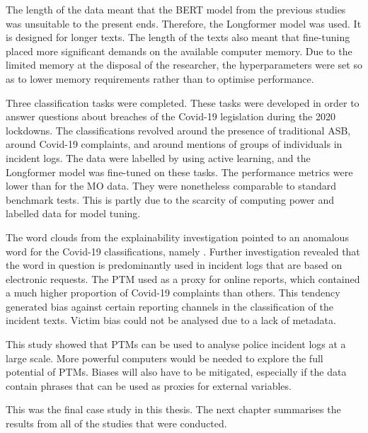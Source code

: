 The length of the data meant that the BERT model from the previous studies was unsuitable to the present ends. Therefore, the Longformer model was used. It is designed for longer texts. The length of the texts also meant that fine-tuning placed more significant demands on the available computer memory. Due to the limited memory at the disposal of the researcher, the hyperparameters were set so as to lower memory requirements rather than to optimise performance.

Three classification tasks were completed. These tasks were developed in order to answer questions about breaches of the Covid-19 legislation during the 2020 lockdowns. The classifications revolved around the presence of traditional ASB, around Covid-19 complaints, and around mentions of groups of individuals in incident logs. The data were labelled by using active learning, and the Longformer model was fine-tuned on these tasks. The performance metrics were lower than for the MO data. They were nonetheless comparable to standard benchmark tests. This is partly due to the scarcity of computing power and labelled data for model tuning.

The word clouds from the explainability investigation pointed to an anomalous word for the Covid-19 classifications, namely . Further investigation revealed that the word in question is predominantly used in incident logs that are based on electronic requests. The PTM used  as a proxy for online reports, which contained a much higher proportion of Covid-19 complaints than others. This tendency generated bias against certain reporting channels in the classification of the incident texts. Victim bias could not be analysed due to a lack of metadata.

This study showed that PTMs can be used to analyse police incident logs at a large scale. More powerful computers would be needed to explore the full potential of PTMs. Biases will also have to be mitigated, especially if the data contain phrases that can be used as proxies for external variables.

This was the final case study in this thesis. The next chapter summarises the results from all of the studies that were conducted.

